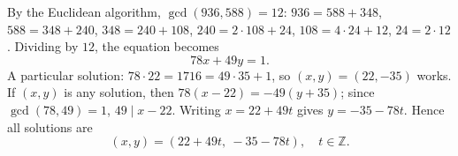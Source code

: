 By the Euclidean algorithm, \(\gcd(936,588)=12\):
\(936=588+348\), \(588=348+240\), \(348=240+108\), \(240=2\cdot108+24\), \(108=4\cdot24+12\), \(24=2\cdot12\).
Dividing by \(12\), the equation becomes
\[
78x+49y=1 .
\]
A particular solution: \(78\cdot22=1716=49\cdot35+1\), so \((x,y)=(22,-35)\) works. If \((x,y)\) is any solution, then \(78(x-22)=-49(y+35)\); since \(\gcd(78,49)=1\), \(49\mid x-22\). Writing \(x=22+49t\) gives \(y=-35-78t\). Hence all solutions are
\[
\boxed{(x,y)=(22+49t,\ -35-78t),\quad t\in\mathbb{Z}}.
\]
